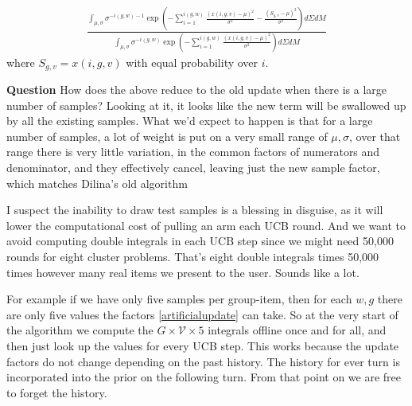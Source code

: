 \documentclass[12pt]{article}
\theoremstyle{definition}
\newcommand{\si}{\ensuremath{\sigma}}
\newcommand{\0}{\ensuremath{\varnothing}}
\newcommand{\1}{{\bf 1}}
\begin{document}
  \begin{align}  \displaystyle \frac{\int_{\mu,\si}    \si   ^{-i(g,w)-1}\exp \left( -\sum_{i=1}^{i(g,w)} \frac{(x(i,g,v) - \mu )^2}{\si^2 } - \frac{(S_{g,v} -   \mu )^2}{  \si^2  } \right)  d\Sigma d M}{\int_{\mu,\si}    \si   ^{-i(g,w)}\exp \left( -\sum_{i=1}^{i(g,w)} \frac{(x(i,g,v) - \mu)^2}{\si^2}\right) d\Sigma d M}\label{artificialupdate}
  \end{align}
  where $S_{g,v} = x(i,g,v)$ with equal probability over $i$. 
  
  {\bf Question} How does the above reduce to the old update when there is a large number of samples? Looking at it, it looks like the new term will be swallowed up by all the existing samples. What we'd expect to happen is that for a large number of samples, a lot of weight is put on a very small range of $\mu,\sigma$, over that range there is very little variation, in the common factors of numerators and denominator, and they effectively cancel, leaving just the new sample factor, which matches Dilina's old algorithm
  
  I suspect the inability to draw test samples is a blessing in disguise, as it will lower the computational cost of pulling an arm each UCB round. And we want to avoid computing double integrals in each UCB step since we might need 50,000 rounds for eight cluster problems. That's eight double integrals times 50,000 times however many real items we present to the user. Sounds like a lot.
  
  
  For example if we have only five samples per group-item, then for each $w,g$ there are only five values the factors \eqref{artificialupdate} can take. So at the very start of the algorithm we compute the    $G \times \mathcal V \times 5$ integrals offline once and for all, and then just look up the values for every UCB step. This works because the update factors do not change depending on the past history. The history for ever turn is incorporated into the prior on the following turn. From that point on we are free to forget the history.
  
  
  
{}

\end{document}
